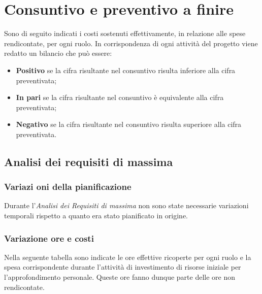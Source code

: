 \section{Consuntivo e preventivo a finire}
Sono di seguito indicati i costi sostenuti effettivamente, in relazione alle spese rendicontate, per ogni ruolo.
In corrispondenza di ogni attività del progetto viene redatto un bilancio che può essere:
\begin{itemize}
	\item \textbf{Positivo} se la cifra risultante nel consuntivo risulta inferiore alla cifra preventivata;
	\item \textbf{In pari} se la cifra risultante nel consuntivo è equivalente alla cifra preventivata;	
	\item \textbf{Negativo} se la cifra risultante nel consuntivo risulta superiore alla cifra preventivata.
\end{itemize}
	\subsection{Analisi dei requisiti di massima}
		\subsubsection{Variazi
			oni della pianificazione}
		Durante l'\textit{Analisi dei Requisiti di massima} non sono state necessarie variazioni temporali rispetto a quanto era stato pianificato in origine.
		\subsubsection{Variazione ore e costi}
		Nella seguente tabella sono indicate le ore effettive ricoperte per ogni ruolo e la spesa corrispondente durante l'attività di investimento di risorse iniziale per l'approfondimento personale. Queste ore fanno dunque parte delle ore non rendicontate.
		
